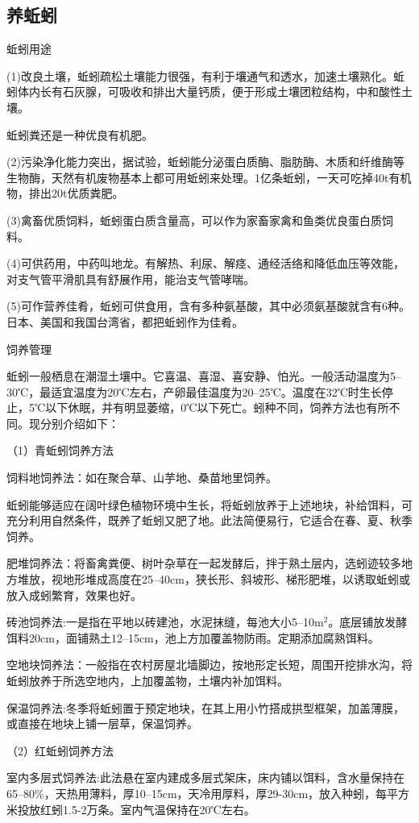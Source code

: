 \documentclass{ctexbook}
\begin{document}
\subsection{养蚯蚓}
蚯蚓用途

(1)改良土壤，蚯蚓疏松土壤能力很强，有利于壤通气和透水，加速土壤熟化。蚯蚓体内长有石灰腺，可吸收和排出大量钙质，便于形成土壤团粒结构，中和酸性土壤。

蚯蚓粪还是一种优良有机肥。

(2)污染净化能力突出，据试验，蚯蚓能分泌蛋白质酶、脂肪酶、木质和纤维酶等生物酶，天然有机废物基本上都可用蚯蚓来处理。1亿条蚯蚓，一天可吃掉40t有机物，排出20t优质粪肥。

(3)禽畜优质饲料，蚯蚓蛋白质含量高，可以作为家畜家禽和鱼类优良蛋白质饲料。

(4)可供药用，中药叫地龙。有解热、利尿、解痉、通经活络和降低血压等效能，对支气管平滑肌具有舒展作用，能治支气管哮喘。

(5)可作营养佳肴，蚯蚓可供食用，含有多种氨基酸，其中必须氨基酸就含有6种。日本、美国和我国台湾省，都把蚯蚓作为佳肴。

饲养管理

蚯蚓一般栖息在潮湿土壤中。它喜温、喜湿、喜安静、怕光。一般活动温度为5--30℃，最适宜温度为20℃左右，产卵最佳温度为20--25℃。温度在32℃时生长停止，5℃以下休眠，并有明显萎缩，0℃以下死亡。蚓种不同，饲养方法也有所不同。现分别介绍如下：

（1）青蚯蚓饲养方法

饲料地饲养法：如在聚合草、山芋地、桑苗地里饲养。

蚯蚓能够适应在阔叶绿色植物环境中生长，将蚯蚓放养于上述地块，补给饵料，可充分利用自然条件，既养了蚯蚓又肥了地。此法简便易行，它适合在春、夏、秋季饲养。

肥堆饲养法：将畜禽粪便、树叶杂草在一起发酵后，拌于熟土层内，选蚓迹较多地方堆放，视地形堆成高度在25--40cm，狭长形、斜坡形、梯形肥堆，以诱取蚯蚓或放入成蚓繁育，效果也好。

砖池饲养法:一是指在平地以砖建池，水泥抹缝，每池大小5--10m$^2$。底层铺放发酵饵料20cm，面铺熟土12--15cm，池上方加覆盖物防雨。定期添加腐熟饵料。

空地块饲养法：一般指在农村房屋北墙脚边，按地形定长短，周围开挖排水沟，将蚯蚓放养于所选空地内，上加覆盖物，土壤内补加饵料。

保温饲养法:冬季将蚯蚓置于预定地块，在其上用小竹搭成拱型框架，加盖薄膜，或直接在地块上铺一层草，保温饲养。

（2）红蚯蚓饲养方法

室内多层式饲养法:此法悬在室内建成多层式架床，床内铺以饵料，含水量保持在65--80\%，天热用薄料，厚10--15cm，天冷用厚料，厚29-30cm，放入种蚓，每平方米投放红蚓1.5-2万条。室内气温保持在20℃左右。
\end{document}
